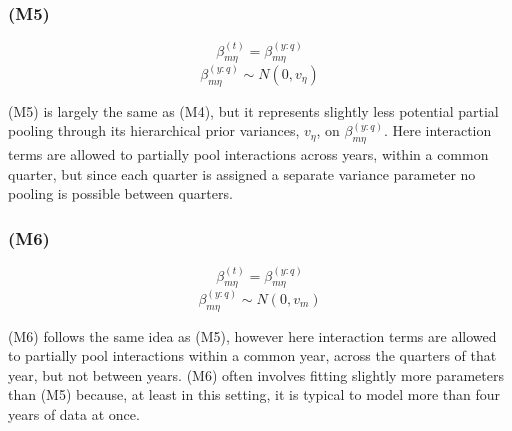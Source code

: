 \documentclass[12pt]{article}
\begin{document}

\subsubsection{(M5)}\label{m5}

\[\beta^{(t)}_{m\eta} = \beta^{(y:q)}_{m\eta}\]
\[\beta^{(y:q)}_{m\eta} \sim N(0, v_\eta)\]

(M5) is largely the same as (M4), but it represents slightly less
potential partial pooling through its hierarchical prior variances,
\(v_\eta\), on \(\beta^{(y:q)}_{m\eta}\). Here interaction terms are
allowed to partially pool interactions across years, within a common
quarter, but since each quarter is assigned a separate variance
parameter no pooling is possible between quarters.

\subsubsection{(M6)}\label{m6}

\[\beta^{(t)}_{m\eta} = \beta^{(y:q)}_{m\eta}\]
\[\beta^{(y:q)}_{m\eta} \sim N(0, v_m)\]

(M6) follows the same idea as (M5), however here interaction terms are
allowed to partially pool interactions within a common year, across the
quarters of that year, but not between years. (M6) often involves
fitting slightly more parameters than (M5) because, at least in this
setting, it is typical to model more than four years of data at once.
\end{document}
